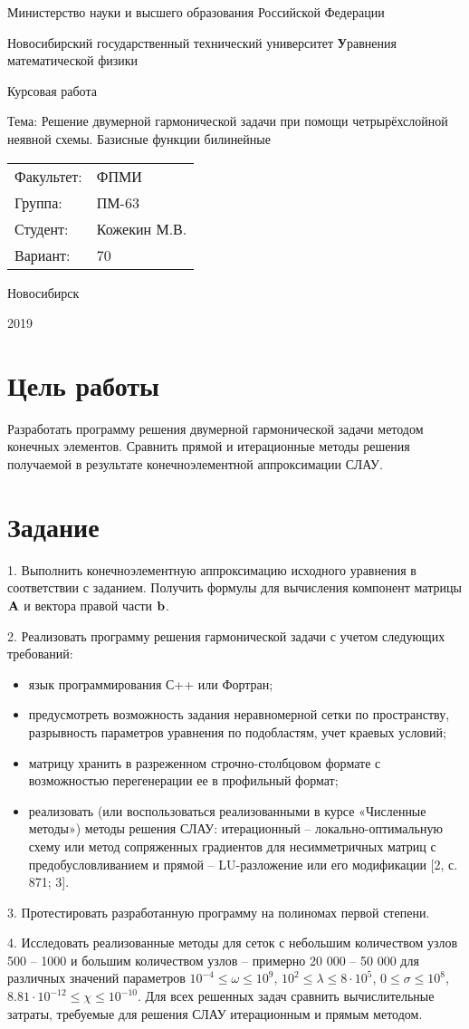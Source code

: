 \documentclass[12pt, a4paper]{article}
\newcommand{\insertTitle}[5]{
\begin{titlepage}
	\begin{center}
    	\large
		Министерство науки и высшего образования Российской Федерации
		
		Новосибирский государственный технический университет
		\vfill
		{\textbf #1}
		
		Курсовая работа
		
		Тема: Решение двумерной гармонической задачи при помощи четрырёхслойной неявной схемы. Базисные функции билинейные
		\vfill
	\end{center}
	
	\begin{tabular}{ m{7em}  m{7em} }
	Факультет: & ФПМИ \\ 
	Группа: & #2 \\  
	Студент: & #3 \\
	Вариант: & #4
	\end{tabular}
	\vfill

\begin{center}
Новосибирск

#5
\end{center}
\end{titlepage}
}
\begin{document}
\setlength{\abovedisplayskip}{1pt}
\setlength{\belowdisplayskip}{1pt}

\insertTitle{Уравнения математической физики}{ПМ-63}{Кожекин М.В.}{70}{2019}


\section{Цель работы}
Разработать программу решения двумерной гармонической задачи методом конечных элементов. Сравнить прямой и итерационные методы решения получаемой в результате конечноэлементной аппроксимации СЛАУ.


\section{Задание}

1.	Выполнить конечноэлементную аппроксимацию исходного уравнения в соответствии с заданием. Получить формулы для вычисления компонент матрицы ${\bf A}$ и вектора правой части ${\bf b}$. 

2.	Реализовать программу решения гармонической задачи с учетом следующих требований:
\begin{itemize}[noitemsep]
\item язык программирования С++ или Фортран;
\item предусмотреть возможность задания неравномерной сетки по пространству, разрывность параметров уравнения по подобластям, учет краевых условий;
\item матрицу хранить в разреженном строчно-столбцовом формате с возможностью перегенерации ее в профильный формат; 
\item реализовать (или воспользоваться реализованными в курсе «Численные методы») методы решения СЛАУ: итерационный – локально-оптимальную схему или метод сопряженных градиентов для несимметричных матриц с предобусловливанием и прямой – LU-разложение или его модификации [2, с. 871; 3].
\end{itemize}

3.	Протестировать разработанную программу на полиномах первой степени.

4.	Исследовать реализованные методы для сеток с небольшим количеством узлов 500 – 1000 и большим количеством узлов – примерно 20 000 – 50 000 для различных значений параметров $ 10^{-4} \leq \omega \leq 10^{9} $, $ 10^{2} \leq \lambda \leq 8\cdot10^{5} $, $ 0 \leq \sigma \leq 10^{8} $, $ 8.81 \cdot 10^{-12} \leq \chi \leq 10^{-10} $. Для всех решенных задач сравнить вычислительные затраты, требуемые для решения СЛАУ итерационным и прямым методом.
\end{document}
